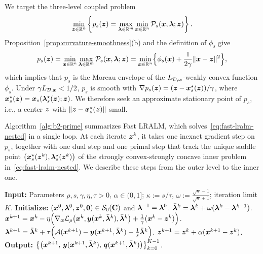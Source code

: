We target the three-level coupled problem
\begin{equation}
    \min_{\bm{z}\in\mathbb{R}^n}\left\{p_s(\bm{z})=\max_{\bm{\lambda}\in\mathbb{R}^m}\min_{\bm{x}\in\mathbb{R}^n}
    \mathcal P_s(\bm{x},\bm{\lambda};\bm{z})\right\}.
    \label{eq:fast-lralm-nested}
\end{equation}
Proposition~\ref{prop:curvature-smoothness}(b) and the definition of \(\phi_s\)
give
\begin{equation}
    p_s(\bm{z})
    =\min_{\bm{x}\in\mathbb{R}^n}\max_{\bm{\lambda}\in\mathbb{R}^m}\mathcal P_s(\bm{x},\bm{\lambda};\bm{z})
    =\min_{\bm{x}\in\mathbb{R}^n}\Bigl\{\phi_s(\bm{x})+\frac{1}{2\gamma}\|\bm{x}-\bm{z}\|^2\Bigr\},
    \label{eq:minimax-equality}
\end{equation}
which implies that \(p_s\) is the Moreau envelope of the
\(L_{\mathcal{D},\bm{x}}\)-weakly convex function \(\phi_s\). Under
\(\gamma L_{\mathcal{D},\bm{x}}<1/2\), \(p_s\) is smooth with
\(\nabla p_s(\bm{z})=(\bm{z}-\bm{x}_s^\star(\bm{z}))/\gamma\), where
\(\bm{x}_s^\star(\bm{z})=\bm{x}_s(\bm{\lambda}_s^\star(\bm{z});\bm{z})\). We therefore seek an approximate stationary point
of \(p_s\), i.e., a center \(\bm{z}\) with \(\|\bm{z}-\bm{x}_s^\star(\bm{z})\|\) small.

Algorithm~\ref{alg:b2-prime} summarizes Fast LRALM, which
solves~\eqref{eq:fast-lralm-nested} in a single loop. At each iterate \(\bm{z}^k\),
it takes one inexact gradient step on \(p_s\), together with one dual step and
one primal step that track the unique saddle point
\(\bigl(\bm{x}_s^\star(\bm{z}^k),\bm{\lambda}_s^\star(\bm{z}^k)\bigr)\) of the strongly
convex-strongly concave inner problem in~\eqref{eq:fast-lralm-nested}. We
describe these steps from the outer level to the inner one.

\begin{algorithm}[t]
    \caption{Fast LRALM}
    \label{alg:b2-prime}
    \small
    \begin{algorithmic}[1]
        \STATE \textbf{Input:} Parameters \(\rho,s,\gamma,\eta,\tau>0\),
        \(\alpha\in(0,1]\); \(\kappa:=s/\tau\),
        \(\omega:=\frac{\sqrt{\kappa}-1}{\sqrt{\kappa}+1}\); iteration limit \(K\).
        \STATE \textbf{Initialize:} \((\bm{x}^0,\bm{\lambda}^0,\bm{z}^0,\bm{0})\in\mathcal S_0(\mathbf C)\)
        and \(\bm{\lambda}^{-1}=\bm{\lambda}^0\).
            \STATE \(\bar{\bm{\lambda}}^k=\bm{\lambda}^k+\omega(\bm{\lambda}^k-\bm{\lambda}^{k-1})\).
            \STATE \(\bm{x}^{k+1}=\bm{x}^k-\eta\Bigl(\nabla_{\bm{x}}\mathcal{L}_\rho\bigl(\bm{x}^k,\bm{y}(\bm{x}^k,\bar{\bm{\lambda}}^k),\bar{\bm{\lambda}}^k\bigr)+\tfrac{1}{\gamma}(\bm{x}^k-\bm{z}^k)\Bigr)\).
            \STATE \(\bm{\lambda}^{k+1}=\bar{\bm{\lambda}}^k+\tau\Bigl(\mathcal{A}(\bm{x}^{k+1})-\bm{y}(\bm{x}^{k+1},\bar{\bm{\lambda}}^k)-\tfrac{1}{s}\bar{\bm{\lambda}}^k\Bigr)\).
            \STATE \(\bm{z}^{k+1}=\bm{z}^k+\alpha(\bm{x}^{k+1}-\bm{z}^k)\).
        \ENDFOR
        \STATE \textbf{Output:}
        \(\bigl\{\bigl(\bm{x}^{k+1},\,\bm{y}(\bm{x}^{k+1},\bar{\bm{\lambda}}^k),\,\bm{q}(\bm{x}^{k+1},\bar{\bm{\lambda}}^k)\bigr)\bigr\}_{k=0}^{K-1}\).
    \end{algorithmic}
\end{algorithm}
